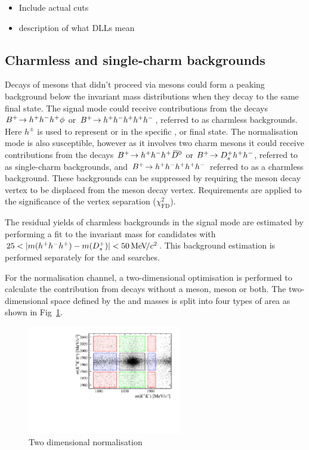 {\color{Red}
\begin{itemize}
\item Include actual cuts
\item description of what DLLs mean
\end{itemize}
}

\subsection{Charmless and single-charm backgrounds}


Decays of \Bp mesons that didn't proceed via \D mesons could form a peaking background below the invariant mass distributions when they decay to the same final state.
The signal mode could receive contributions from the decays ${{{B}^+}}\!\rightarrow h^{+}h^{-}h^{+}\phi$ or ${{{B}^+}}\!\rightarrow h^{+}h^{-}h^{+}h^{+}h^{-}$, referred to as charmless backgrounds. Here $h^{\pm}$ is used to represent \Kpm or \pipm in the specific \Dsp, \Dzb or \phiz final state.
The normalisation mode is also susceptible, however as it involves two charm mesons it could receive contributions from the decays ${{{B}^+}}\!\rightarrow h^{+}h^{-}h^{+}{{\kern 0.2em\overline{\kern -0.2em D}{}}{}^0}$ or ${{{B}^+}}\!\rightarrow {\ensuremath{{D}^+_{s}}} h^{+}h^{-}$, referred to as single-charm backgrounds, and ${{{B}^+}}\!\rightarrow h^{+}h^{-}h^{+} h^{+}h^{-}$ referred to as a charmless background.
These backgrounds can be suppressed by requiring the \D meson decay vertex to be displaced from the \Bp meson decay vertex. Requirements are applied to the significance of the vertex separation ($\chi^{2}_{\text{FD}}$).

The residual yields of charmless backgrounds in the signal mode are estimated by performing a fit to the \Bp invariant mass for candidates with $25 < |m(h^{+}h^{-}h^{+}) - m({{D}^+_{s}})| < 50{\mathrm{\,Me\kern -0.1em V\!/}c^2} $. This background estimation is performed separately for the \decay{\Bp}{\Dsp\phiz} and \decay{\Bp}{\Dsp\Kp\Km} searches. 

For the \decay{\Bp}{\Dsp\Dzb} normalisation channel, a two-dimensional optimisation is performed to calculate the contribution from decays without a \Dsp meson, \Dzb meson or both. 
The two-dimensional space defined by the \Dsp and \Dzb masses is split into four types of area as shown in Fig~\ref{fig:2d_normalisation}.

\begin{figure}[!h]
    \centering
        \includegraphics[width=0.6\textwidth]{figs/Selection/B2DsD0_2D_mass_Ds2KKPiRun2.pdf}
        \caption{Two dimensional normalisation}
    \label{fig:2d_normalisation}   
\end{figure}


